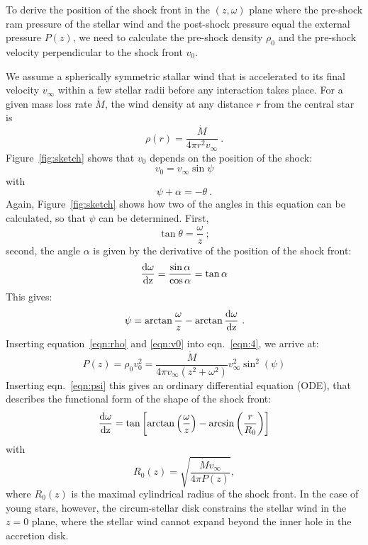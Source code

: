 To derive the position of the shock front in the $(z, \omega)$ plane where the pre-shock ram pressure of the stellar wind and the post-shock pressure equal the external pressure $P(z)$, we need to calculate the pre-shock density $\rho_0$ and the pre-shock velocity perpendicular to the shock front $v_0$.

We assume a spherically symmetric stallar wind that is accelerated to its final velocity $v_{\infty}$ within a few stellar radii before any interaction takes place. For a given mass loss rate $\dot M$, the wind density at any distance $r$ from the central star is 
\begin{equation}\label{eqn:rho}
\rho(r) = \frac{\dot M}{4 \pi r^2 v_{\infty}}\ .
\end{equation}
Figure~\ref{fig:sketch} shows that $v_0$ depends on the position of the shock:
\begin{equation}
\label{eqn:v0}v_0 = v_{\infty} \sin \psi
\end{equation}
with 
\begin{equation}\label{eqn:angle}
\psi+\alpha = - \theta \ .
\end{equation}
Again, Figure~\ref{fig:sketch} shows how two of the angles in this equation can be calculated, so that $\psi$ can be determined. First,
\begin{equation}\label{eqn:theta}
\tan\theta = \frac{\omega}{z}\ ;
\end{equation}
second, the angle $\alpha$ is given by the derivative of the position of the shock front:
\begin{equation}\label{eqn:deriv}
\frac{\rm{d}\omega}{\rm{d}z} = \frac{\sin \alpha}{\cos \alpha} = \tan{\alpha}
\end{equation}
This gives:
\begin{equation}\label{eqn:psi}
\psi = \arctan{\frac{\omega}{z}} - \arctan{\frac{\rm{d}\omega}{\rm{d}z}}\ .
\end{equation}
Inserting equation~\ref{eqn:rho} and \ref{eqn:v0} into eqn.~\ref{eqn:4}, we arrive at: 
\begin{equation}
P(z) = \rho_0v_0^2 = \frac{\dot{M}}{4\pi v_{\infty}(z^2+\omega^2)} v_{\infty}^2 \sin^2(\psi)
\end{equation}
Inserting eqn.~\ref{eqn:psi} this gives an ordinary differential equation (ODE), that describes the functional form of the shape of the shock front:
\begin{equation}\label{eqn:ode}
\frac{\rm{d}\omega}{\rm{d}z} = \tan\left[\arctan\left(\frac{\omega}{z}\right)-\arcsin\left(\frac{r}{R_0}\right)\right]
\end{equation}
with
\begin{equation}
R_0(z) = \sqrt{\frac{\dot{M} v_{\infty}}{4\pi P(z)}},
\end{equation}
where $R_0(z)$ is the maximal cylindrical radius of the shock front. In the case of young stars, however,  the circum-stellar disk constrains the stellar wind in the $z=0$ plane, where the stellar wind cannot expand beyond the inner hole in the accretion disk.

